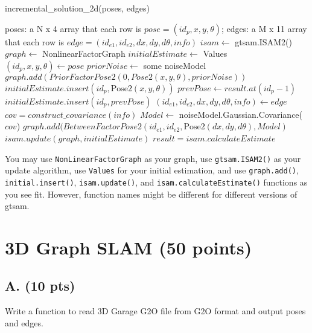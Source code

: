 \documentclass{article}
\begin{document}
\begin{algorithm}
\caption{incremental\_solution\_2d(poses, edges)}
\begin{algorithmic}[1]
\Require poses: a N x 4 array that each row is $pose=(id_{p},x,y,\theta)$; edges: a M x 11 array that each row is $edge=(id_{e1},id_{e2},dx,dy,d\theta,info)$
\State $isam \leftarrow$ gtsam.ISAM2() 
    \State $graph \leftarrow$ NonlinearFactorGraph 
    \State $initialEstimate \leftarrow$ Values 
    \State $(id_{p},x,y,\theta) \gets pose$ 
        \State $priorNoise \leftarrow$ some noiseModel 
        \State $graph.add(PriorFactorPose2(0,Pose2(x,y,\theta),priorNoise))$
        \State $initialEstimate.insert(id_{p},\text{Pose2}(x,y,\theta))$
    \Else {}
        \State $prevPose \gets result.at(id_{p}-1)$ 
        \State $initialEstimate.insert(id_{p},prevPose)$
    \EndIf
        \State $(id_{e1},id_{e2},dx,dy,d\theta,info) \gets edge$ 
            \State $cov=construct\_covariance(info)$ 
            \State $Model \leftarrow$ noiseModel.Gaussian.Covariance($cov$)
            \State $graph.add(BetweenFactorPose2(id_{e1},id_{e2},\text{Pose2}(dx,dy,d\theta),Model)$
        \EndIf
    \EndFor
    \State $isam.update(graph,initialEstimate)$
    \State $result=isam.calculateEstimate$
\EndFor
\end{algorithmic}
\end{algorithm}

You may use \texttt{NonLinearFactorGraph} as your graph, use \texttt{gtsam.ISAM2()} as your update algorithm, use \texttt{Values} for your initial estimation, and use \texttt{graph.add()}, \texttt{initial.insert()}, \texttt{isam.update()}, and \texttt{isam.calculateEstimate()} functions as you see fit. However, function names might be different for different versions of gtsam.

\section{3D Graph SLAM (50 points)}
\subsection{A. (10 pts)}
Write a function to read 3D Garage G2O file from G2O format and output poses and edges.
\end{document}
